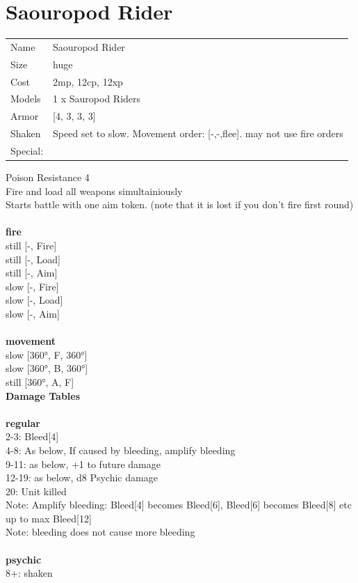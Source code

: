 \clearpage

\section{ Saouropod Rider }

\begin{tabular}{ll}
  Name & Saouropod Rider \\
  Size & huge\\
  Cost & 2mp, 12cp, 12xp\\
  Models & 1 x Sauropod Riders\\
  Armor & [4, 3, 3, 3]\\
  Shaken & Speed set to slow. Movement order: [-,-,flee]. may not use fire orders\\
  Special: \\
\end{tabular}

\noindent Poison Resistance 4\\ 
Fire and load all weapons simultainiously\\ 
Starts battle with one aim token. (note that it is lost if you don't fire first round)\\ 


\ \\ {\bf fire } \\
still [-, Fire] \\
still [-, Load] \\
still [-, Aim] \\
slow [-, Fire] \\
slow [-, Load] \\
slow [-, Aim] \\
\ \\ {\bf movement } \\
slow [360°, F, 360°] \\
slow [360°, B, 360°] \\
still [360°, A, F] \\


{\bf Damage Tables} \\
\ \\ {\bf regular } \\
2-3: Bleed[4] \\
4-8: As below, If caused by bleeding, amplify bleeding \\
9-11: as below, +1 to future damage \\
12-19: as below, d8 Psychic damage \\
20: Unit killed \\
Note: Amplify bleeding: Bleed[4] becomes Bleed[6], Bleed[6] becomes Bleed[8] etc up to max Bleed[12] \\
Note: bleeding does not cause more bleeding \\
\ \\ {\bf psychic } \\
8+: shaken \\


